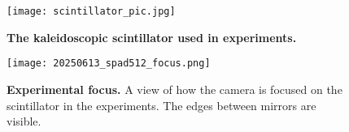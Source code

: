 \documentclass{article}
\begin{document}
\begin{figure}
\centering
\texttt{[image: scintillator\_pic.jpg]}
\caption{\textbf{The kaleidoscopic scintillator used in experiments.}}
\label{fig:scintillator}
\end{figure}

\iffalse
\begin{figure}
\centering
\texttt{[image: setup\_pic.jpg]}
\caption{The experimental setup without the gamma-ray source.} 
\label{fig:setup}
\end{figure}
\fi

\begin{figure}
\centering
\texttt{[image: 20250613\_spad512\_focus.png]}
\caption{\textbf{Experimental focus.} A view of how the camera is focused on the scintillator in the experiments. The edges between mirrors are visible.} 
\label{fig:experiment_focus}
\end{figure}
\end{document}
